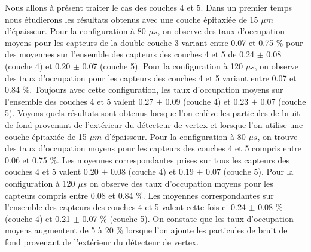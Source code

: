   Nous allons \`a pr\'esent traiter le cas des couches 4 et 5. Dans un premier temps nous \'etudierons les r\'esultats obtenus avec une couche \'epitaxi\'ee de 15 $\mu m$ d'\'epaisseur. Pour la configuration \`a 80 $\mu s$, on observe des taux d'occupation moyens pour les capteurs de la double couche 3 variant entre 0.07 et 0.75 $\%$ pour des moyennes sur l'ensemble des capteurs des couches 4 et 5 de 0.24 $\pm$ 0.08 (couche 4) et 0.20 $\pm$ 0.07 (couche 5). Pour la configuration \`a 120 $\mu s$, on observe des taux d'occupation pour les capteurs des couches 4 et 5 variant entre 0.07 et 0.84 $\%$. Toujours avec cette configuration, les taux d'occupation moyens sur l'ensemble des couches 4 et 5 valent 0.27 $\pm$ 0.09 (couche 4) et 0.23 $\pm$ 0.07 (couche 5). Voyons quels r\'esultats sont obtenus lorsque l'on enl\`eve les particules de bruit de fond provenant de l'ext\'erieur du d\'etecteur de vertex et lorsque l'on utilise une couche \'epitaxi\'ee de 15 $\mu m$ d'\'epaisseur. Pour la configuration \`a 80 $\mu s$, on trouve des taux d'occupation moyens pour les capteurs des couches 4 et 5 compris entre 0.06 et 0.75 $\%$. Les moyennes correspondantes prises sur tous les capteurs des couches 4 et 5 valent 0.20 $\pm$ 0.08 (couche 4) et 0.19 $\pm$ 0.07 (couche 5). Pour la configuration \`a 120 $\mu s$ on observe des taux d'occupation moyens pour les capteurs compris entre 0.08 et 0.84 $\%$. Les moyennes correspondantes sur l'ensemble des capteurs des couches 4 et 5 valent cette fois-ci 0.24 $\pm$ 0.08 $\%$ (couche 4) et 0.21 $\pm$ 0.07 $\%$ (couche 5). On constate que les taux d'occupation moyens augmentent de 5 \`a 20 $\%$ lorsque l'on ajoute les particules de bruit de fond provenant de l'ext\'erieur du d\'etecteur de vertex.

  \medskip
  
